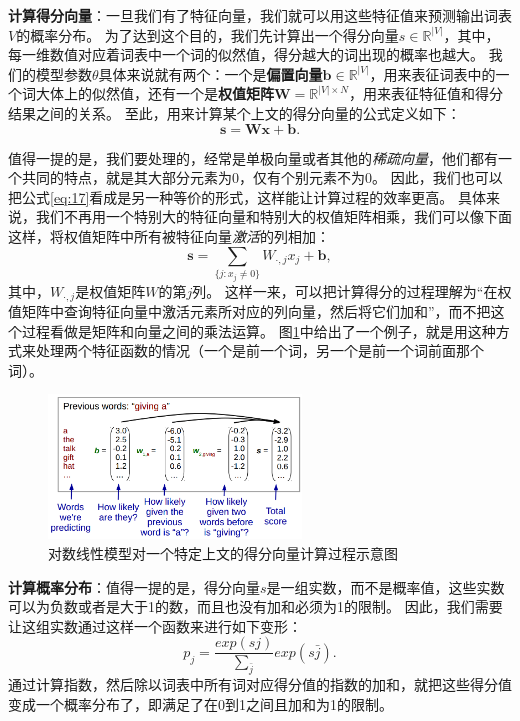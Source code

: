 \documentclass[10pt,a4paper]{ctexart}
\begin{document}
\textbf{计算得分向量}：一旦我们有了特征向量，我们就可以用这些特征值来预测输出词表$V$的概率分布。
为了达到这个目的，我们先计算出一个得分向量$s \in \mathbb{R}^{|V|}$，其中，每一维数值对应着词表中一个词的似然值，得分越大的词出现的概率也越大。
我们的模型参数$\theta$具体来说就有两个：一个是\textbf{偏置向量}$\textbf{b} \in \mathbb{R}^{|V|}$，用来表征词表中的一个词大体上的似然值，还有一个是\textbf{权值矩阵}$\textbf{W} = \mathbb{R}^{|V| \times N}$，用来表征特征值和得分结果之间的关系。
至此，用来计算某个上文的得分向量的公式定义如下：
\begin{equation}\label{eq:17}
 \textbf{s} = \textbf{Wx} + \textbf{b}.
\end{equation}

值得一提的是，我们要处理的，经常是单极向量或者其他的\textit{稀疏向量}，他们都有一个共同的特点，就是其大部分元素为0，仅有个别元素不为0。
因此，我们也可以把公式\ref{eq:17}看成是另一种等价的形式，这样能让计算过程的效率更高。
具体来说，我们不再用一个特别大的特征向量和特别大的权值矩阵相乘，我们可以像下面这样，将权值矩阵中所有被特征向量\textit{激活}的列相加：
\begin{equation}\label{eq:18}
 \textbf{s} = \sum_{\{j:x_j \neq 0\}} W_{\cdot,j}x_{j} + \textbf{b},
\end{equation}
其中，$W_{\cdot,j}$是权值矩阵$W$的第$j$列。
这样一来，可以把计算得分的过程理解为“在权值矩阵中查询特征向量中激活元素所对应的列向量，然后将它们加和”，而不把这个过程看做是矩阵和向量之间的乘法运算。
图\ref{fig:5}中给出了一个例子，就是用这种方式来处理两个特征函数的情况（一个是前一个词，另一个是前一个词前面那个词）。

\begin{figure}[H]
\centering
\includegraphics[width=0.6\textwidth]{fig5.png}
\caption{对数线性模型对一个特定上文的得分向量计算过程示意图}
\label{fig:5}
\end{figure}

\textbf{计算概率分布}：值得一提的是，得分向量\textbf{$s$}是一组实数，而不是概率值，这些实数可以为负数或者是大于1的数，而且也没有加和必须为1的限制。
因此，我们需要让这组实数通过这样一个函数来进行如下变形：
\begin{equation}\label{eq:19}
 p_{j} = \frac{exp(sj)}{\sum_{\bar{j}}}exp(s\bar{j}).
\end{equation}
通过计算指数，然后除以词表中所有词对应得分值的指数的加和，就把这些得分值变成一个概率分布了，即满足了在0到1之间且加和为1的限制。
\end{document}
